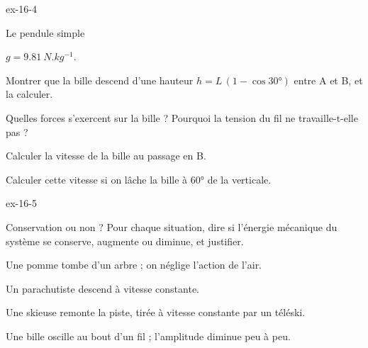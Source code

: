 \begin{blocLivre}{ex-16-4}
\begin{exercice}[1]{Le pendule simple}
\begin{donnees}
$g=\qty{9,81}{N.kg^{-1}}$.
\end{donnees}
\begin{questions}
\item Montrer que la bille descend d'une hauteur $h=L\,(1-\cos\ang{30})$ entre A et B, et la calculer.
\item Quelles forces s'exercent sur la bille ? Pourquoi la tension du fil ne travaille-t-elle pas ?
\item Calculer la vitesse de la bille au passage en B.
\item Calculer cette vitesse si on lâche la bille à \ang{60} de la verticale.
\end{questions}
\end{exercice}
\end{blocLivre}
\begin{blocLivre}{ex-16-5}
\begin{exercice}[1]{Conservation ou non ?}
Pour chaque situation, dire si l'énergie mécanique du système se conserve, augmente ou diminue, et justifier.
\begin{questions}
\item Une pomme tombe d'un arbre ; on néglige l'action de l'air.
\item Un parachutiste descend à vitesse constante.
\item Une skieuse remonte la piste, tirée à vitesse constante par un téléski.
\item Une bille oscille au bout d'un fil ; l'amplitude diminue peu à peu.
\end{questions}
\end{exercice}
\end{blocLivre}
